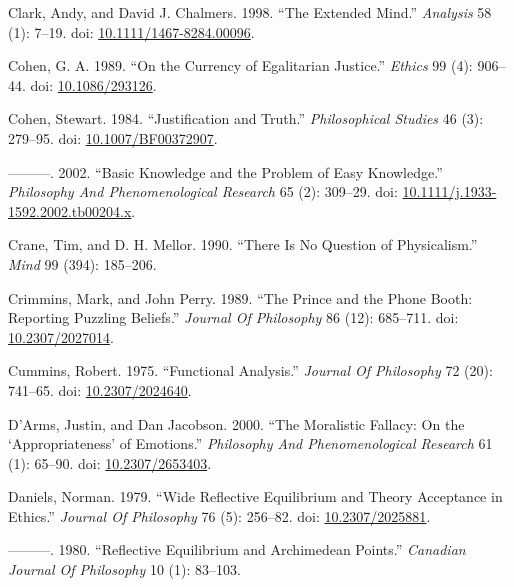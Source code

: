 \documentclass[
  10pt,
  letterpaper,
  DIV=11,
  numbers=noendperiod,
  twoside]{scrartcl}
\newlength{\cslhangindent}
\newenvironment{CSLReferences}[2] %
 {\begin{list}{}{%
  \setlength{\itemindent}{0pt}
  \setlength{\leftmargin}{0pt}
  \setlength{\parsep}{0pt}
  \ifodd #1
   \setlength{\leftmargin}{\cslhangindent}
   \setlength{\itemindent}{-1\cslhangindent}
  \fi
  \setlength{\itemsep}{#2\baselineskip}}}
 {\end{list}}
\begin{document}
\begin{CSLReferences}{1}{0}
Clark, Andy, and David J. Chalmers. 1998. {``The Extended Mind.''}
\emph{Analysis} 58 (1): 7--19. doi:
\href{https://doi.org/10.1111/1467-8284.00096}{10.1111/1467-8284.00096}.

Cohen, G. A. 1989. {``On the Currency of Egalitarian Justice.''}
\emph{Ethics} 99 (4): 906--44. doi:
\href{https://doi.org/10.1086/293126}{10.1086/293126}.

Cohen, Stewart. 1984. {``Justification and Truth.''} \emph{Philosophical
Studies} 46 (3): 279--95. doi:
\href{https://doi.org/10.1007/BF00372907}{10.1007/BF00372907}.

---------. 2002. {``Basic Knowledge and the Problem of Easy
Knowledge.''} \emph{Philosophy And Phenomenological Research} 65 (2):
309--29. doi:
\href{https://doi.org/10.1111/j.1933-1592.2002.tb00204.x}{10.1111/j.1933-1592.2002.tb00204.x}.

Crane, Tim, and D. H. Mellor. 1990. {``There Is No Question of
Physicalism.''} \emph{Mind} 99 (394): 185--206.

Crimmins, Mark, and John Perry. 1989. {``The Prince and the Phone Booth:
Reporting Puzzling Beliefs.''} \emph{Journal Of Philosophy} 86 (12):
685--711. doi: \href{https://doi.org/10.2307/2027014}{10.2307/2027014}.

Cummins, Robert. 1975. {``Functional Analysis.''} \emph{Journal Of
Philosophy} 72 (20): 741--65. doi:
\href{https://doi.org/10.2307/2024640}{10.2307/2024640}.

D'Arms, Justin, and Dan Jacobson. 2000. {``The Moralistic Fallacy: On
the {`Appropriateness'} of Emotions.''} \emph{Philosophy And
Phenomenological Research} 61 (1): 65--90. doi:
\href{https://doi.org/10.2307/2653403}{10.2307/2653403}.

Daniels, Norman. 1979. {``Wide Reflective Equilibrium and Theory
Acceptance in Ethics.''} \emph{Journal Of Philosophy} 76 (5): 256--82.
doi: \href{https://doi.org/10.2307/2025881}{10.2307/2025881}.

---------. 1980. {``Reflective Equilibrium and Archimedean Points.''}
\emph{Canadian Journal Of Philosophy} 10 (1): 83--103.


\end{CSLReferences}
\end{document}
